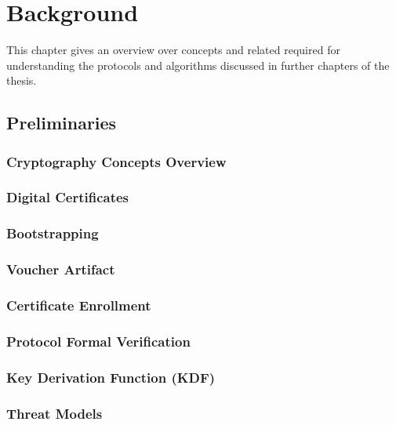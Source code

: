 \chapter{Background}
\label{ch:background}
This chapter gives an overview over concepts and related required for understanding the protocols and algorithms discussed in further chapters of the thesis.
\section{Preliminaries}

\subsection{Cryptography Concepts Overview}


\subsection{Digital Certificates}


\subsection{Bootstrapping}


\subsection{Voucher Artifact}


\subsection{Certificate Enrollment}


\subsection{Protocol Formal Verification}\label{bg:pfm}


\subsection{Key Derivation Function (KDF)} \label{backgroung:kdf}


\subsection{Threat Models}

